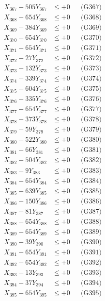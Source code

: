 \documentclass[a4paper,10pt]{article}
\begin{document}
{\begin{align}
X_{367} - 505Y_{367} &\leq +0 && \text{(G367)} \\
X_{368} - 654Y_{368} &\leq +0 && \text{(G368)} \\
X_{369} - 384Y_{369} &\leq +0 && \text{(G369)} \\
X_{370} - 654Y_{370} &\leq +0 && \text{(G370)} \\
\allowbreak
X_{371} - 654Y_{371} &\leq +0 && \text{(G371)} \\
X_{372} - 27Y_{372} &\leq +0 && \text{(G372)} \\
X_{373} - 132Y_{373} &\leq +0 && \text{(G373)} \\
X_{374} - 339Y_{374} &\leq +0 && \text{(G374)} \\
X_{375} - 604Y_{375} &\leq +0 && \text{(G375)} \\
X_{376} - 335Y_{376} &\leq +0 && \text{(G376)} \\
X_{377} - 654Y_{377} &\leq +0 && \text{(G377)} \\
X_{378} - 373Y_{378} &\leq +0 && \text{(G378)} \\
X_{379} - 59Y_{379} &\leq +0 && \text{(G379)} \\
X_{380} - 522Y_{380} &\leq +0 && \text{(G380)} \\
\allowbreak
X_{381} - 66Y_{381} &\leq +0 && \text{(G381)} \\
X_{382} - 504Y_{382} &\leq +0 && \text{(G382)} \\
X_{383} - 9Y_{383} &\leq +0 && \text{(G383)} \\
X_{384} - 654Y_{384} &\leq +0 && \text{(G384)} \\
X_{385} - 639Y_{385} &\leq +0 && \text{(G385)} \\
X_{386} - 150Y_{386} &\leq +0 && \text{(G386)} \\
X_{387} - 81Y_{387} &\leq +0 && \text{(G387)} \\
X_{388} - 654Y_{388} &\leq +0 && \text{(G388)} \\
X_{389} - 654Y_{389} &\leq +0 && \text{(G389)} \\
X_{390} - 39Y_{390} &\leq +0 && \text{(G390)} \\
\allowbreak
X_{391} - 654Y_{391} &\leq +0 && \text{(G391)} \\
X_{392} - 654Y_{392} &\leq +0 && \text{(G392)} \\
X_{393} - 13Y_{393} &\leq +0 && \text{(G393)} \\
X_{394} - 37Y_{394} &\leq +0 && \text{(G394)} \\
X_{395} - 654Y_{395} &\leq +0 && \text{(G395)} \\

\end{align}}
\end{document}
